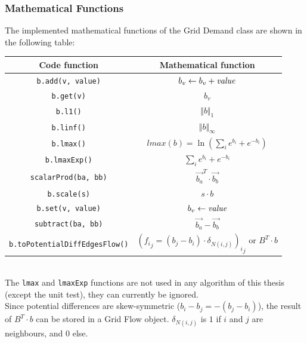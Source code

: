 \subsubsection{Mathematical Functions}
The implemented mathematical functions of the Grid Demand class are shown in the following table:\\
\begin{tabular}{c|c}
Code function&Mathematical function\\
\hline
\texttt{b.add(v, value)}&$b_v\gets b_v+\emph{value}$\\
\hline
\texttt{b.get(v)}&$b_v$\\
\hline
\texttt{b.l1()}&$\Vert b\Vert_1$\\
\hline
\texttt{b.linf()}&$\Vert b\Vert_\infty$\\
\hline
\texttt{b.lmax()}&$lmax(b)=\ln\left(\sum_ie^{b_i}+e^{-b_i}\right)$\\
\hline
\texttt{b.lmaxExp()}&$\sum_ie^{b_i}+e^{-b_i}$\\
\hline
\texttt{scalarProd(ba, bb)}&$\vec{b_a}^T\cdot \vec{b_b}$\\
\hline
\texttt{b.scale(s)}&$s\cdot b$\\
\hline
\texttt{b.set(v, value)}&$b_v\gets \emph{value}$\\
\hline
\texttt{subtract(ba, bb)}&$\vec{b_a}-\vec{b_b}$\\
\hline
\texttt{b.toPotentialDiffEdgesFlow()}&${\left({f_i}_j=\left(b_j-b_i\right)\cdot \delta_{N(i,j)}\right)_i}_j$ or $B^T\cdot b$\\
\hline
\end{tabular}\\

The \texttt{lmax} and \texttt{lmaxExp} functions are not used in any algorithm of this thesis (except the unit test), they can currently be ignored.\\
Since potential differences are skew-symmetric ($b_i-b_j=-(b_j-b_i)$), the result of $B^T\cdot b$ can be stored in a Grid Flow object. $\delta_{N(i,j)}$ is $1$ if $i$ and $j$ are neighbours, and $0$ else. 
